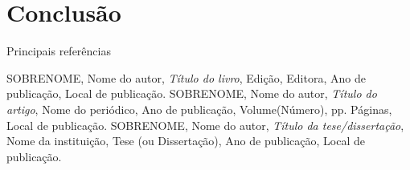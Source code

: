 \section{Conclusão} %

\begin{frame}{Principais referências}
    \footnotesize
    \begin{thebibliography}{99}
         SOBRENOME, Nome do autor, \textit{Título do livro}, Edição, Editora, Ano de publicação, Local de publicação.
         SOBRENOME, Nome do autor, \textit{Título do artigo}, Nome do periódico, Ano de publicação, Volume(Número), pp. Páginas, Local de publicação.
         SOBRENOME, Nome do autor, \textit{Título da tese/dissertação}, Nome da instituição, Tese (ou Dissertação), Ano de publicação, Local de publicação.
    \end{thebibliography}
\end{frame}
